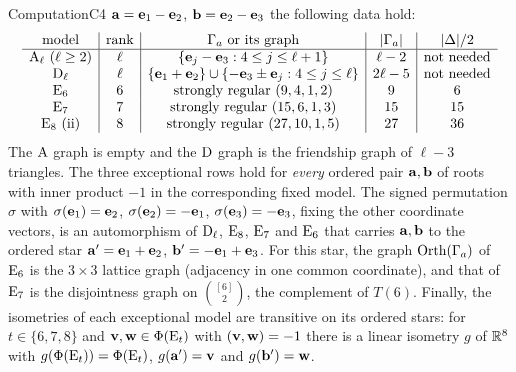\begin{namedresult}{Computation}{C4}
{ ${\mathbf a}={\mathbf e}_1-{\mathbf e}_2$, ${\mathbf b}={\mathbf e}_2-{\mathbf e}_3$ the following data hold:
 \[
 \begin{array}{c|c|c|c|c}
 \text{model}&\text{rank}&\Gamma_a\text{ or its graph}&|\Gamma_a|&|\Delta|/2\\\hline
 \mathrm{A}_\ell\ (\ell\geq2)&\ell&\{{\mathbf e}_j-{\mathbf e}_3:4\leq j\leq\ell+1\}&\ell-2&\text{not needed}\\
 \mathrm{D}_\ell&\ell&\{{\mathbf e}_1+{\mathbf e}_2\}\cup\{-{\mathbf e}_3\pm{\mathbf e}_j:4\leq j\leq\ell\}&2\ell-5&\text{not needed}\\
 \mathrm{E}_6&6&\text{strongly regular }(9,4,1,2)&9&6\\
 \mathrm{E}_7&7&\text{strongly regular }(15,6,1,3)&15&15\\
 \mathrm{E}_8\text{ (ii)}&8&\text{strongly regular }(27,10,1,5)&27&36
 \end{array}
 \]
 The $\mathrm{A}$ graph is empty and the $\mathrm{D}$ graph is the friendship graph of $\ell-3$ triangles.
 The three exceptional rows hold for \emph{every} ordered pair ${\mathbf a},{\mathbf b}$ of roots
 with inner product $-1$ in the corresponding fixed model. The signed permutation
 $\sigma$ with $\sigma({\mathbf e}_1)={\mathbf e}_2$, $\sigma({\mathbf e}_2)=-{\mathbf e}_1$, $\sigma({\mathbf e}_3)=-{\mathbf e}_3$,
 fixing the other coordinate vectors, is an automorphism of $\mathrm{D}_\ell$, $\mathrm{E}_8$,
 $\mathrm{E}_7$ and $\mathrm{E}_6$ that carries ${\mathbf a},{\mathbf b}$ to the ordered star
 ${\mathbf a}'={\mathbf e}_1+{\mathbf e}_2$, ${\mathbf b}'=-{\mathbf e}_1+{\mathbf e}_3$. For this star, the graph $\mathop{\mathrm{Orth}}\nolimits(\Gamma_a)$ of
 $\mathrm{E}_6$ is the $3\times3$ lattice graph (adjacency in one common coordinate), and that
 of $\mathrm{E}_7$ is the disjointness graph on $\binom{[6]}2$, the complement of $T(6)$. Finally,
 the isometries of each exceptional model are transitive on its ordered stars: for
 $t\in\{6,7,8\}$ and ${\mathbf v},{\mathbf w}\in\Phi(\mathrm{E}_t)$ with $({\mathbf v},{\mathbf w})=-1$ there is a linear isometry
 $g$ of ${\mathbb R}^8$ with $g(\Phi(\mathrm{E}_t))=\Phi(\mathrm{E}_t)$, $g({\mathbf a}')={\mathbf v}$ and $g({\mathbf b}')={\mathbf w}$.}
\end{namedresult}
